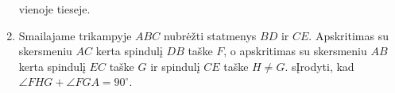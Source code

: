 \begin{enumerate}
  vienoje tieseje.
  \item Smailajame trikampyje $ABC$ nubrėžti statmenys $BD$ ir $CE$.
Apskritimas su skersmeniu $AC$ kerta spindulį $DB$ taške $F$, o 
apskritimas su skersmeniu $AB$ kerta spindulį $EC$ taške $G$ ir
spindulį $CE$ taške $H\neq G$. sĮrodyti, kad $\angle FHG+\angle
 FGA=90^\circ$.
\end{enumerate}



